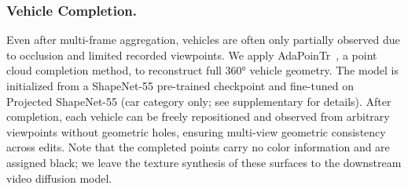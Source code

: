 \documentclass[runningheads]{llncs}
\begin{document}
\subsubsection{Vehicle Completion.}
Even after multi-frame aggregation, vehicles are often only partially observed due to occlusion and limited recorded viewpoints. 
We apply AdaPoinTr~\cite{yu2021pointr}, a point cloud completion method, to reconstruct full 360° vehicle geometry. The model is initialized from a ShapeNet-55 pre-trained checkpoint and fine-tuned on Projected ShapeNet-55 (car category only; see supplementary for details). After completion, each vehicle can be freely repositioned and observed from arbitrary viewpoints without geometric holes, ensuring multi-view geometric consistency across edits. Note that the completed points carry no color information and are assigned black; we leave the texture synthesis of these surfaces to the downstream video diffusion model. 

\end{document}
